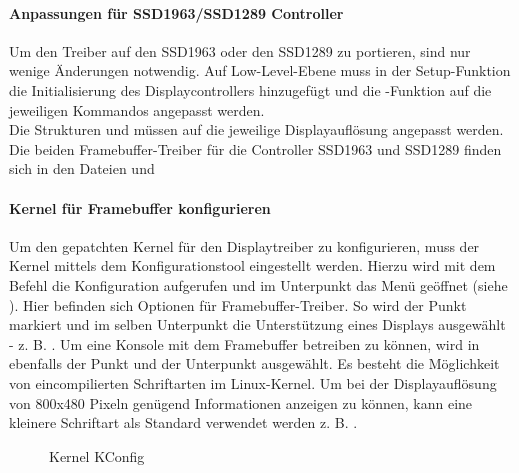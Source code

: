 \paragraph{Anpassungen für SSD1963/SSD1289 Controller}
Um den Treiber auf den SSD1963 oder den SSD1289 zu portieren, sind nur wenige Änderungen notwendig. Auf Low-Level-Ebene muss in der Setup-Funktion die Initialisierung des Displaycontrollers hinzugefügt und die -Funktion auf die jeweiligen Kommandos angepasst werden. \\
Die Strukturen  und  müssen auf die jeweilige Displayauflösung angepasst werden. Die beiden Framebuffer-Treiber für die Controller SSD1963 und SSD1289 finden sich in den Dateien  und 
\newpage
\paragraph{Kernel für Framebuffer konfigurieren}
Um den gepatchten Kernel für den Displaytreiber zu konfigurieren, muss der Kernel mittels dem Konfigurationstool  eingestellt werden. 
Hierzu wird mit dem Befehl  die Konfiguration aufgerufen und im Unterpunkt  das Menü  geöffnet (siehe ). Hier befinden sich Optionen für Framebuffer-Treiber. So wird der Punkt  markiert und im selben Unterpunkt die Unterstützung eines Displays ausgewählt - z. B. . 
Um eine Konsole mit dem Framebuffer betreiben zu können, wird in  
ebenfalls der Punkt  und der Unterpunkt  ausgewählt. Es besteht die Möglichkeit von eincompilierten Schriftarten im Linux-Kernel. Um bei der Displayauflösung von 800x480 Pixeln genügend Informationen anzeigen zu können, kann eine kleinere Schriftart als Standard verwendet werden z. B. .
\begin{figure}[tbph]
	\centering
{}
	\caption{Kernel KConfig}
	\label{fig:kernel_config}
\end{figure}
\newpage
